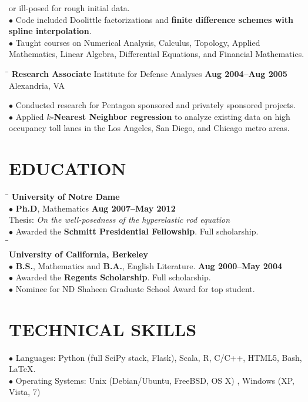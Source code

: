 \documentclass{resume}
\begin{document}
\begin{resume}
or ill-posed for rough initial data. \\
$\bullet$ Code included Doolittle factorizations and \textbf{finite
difference schemes with spline interpolation}. \\
$\bullet$ Taught courses on Numerical Analysis, Calculus,
Topology, Applied Mathematics, Linear Algebra,
Differential Equations, and Financial Mathematics.
\begin{tabbing}
\hspace{2.3in}\= \hspace{2.6in}\= \kill
{\bf Research Associate } \> Institute for
Defense Analyses \>  
\textbf{Aug 2004--Aug 2005}\\
    \>Alexandria, VA
\end{tabbing}
$\bullet$ Conducted research for Pentagon sponsored and privately
sponsored projects. 
\\ 
$\bullet$ Applied \textbf{$k$-Nearest Neighbor regression} to analyze existing data on high
occupancy toll lanes in the Los
Angeles, San Diego, and
Chicago metro areas.
\section{EDUCATION} 
\vspace{-0.05mm}
\begin{tabbing}
\hspace{2.3in}\= \hspace{2.6in}\= \kill
\textbf{University of Notre Dame} \\
$\bullet$ \textbf{Ph.D}, Mathematics \>\>\textbf{Aug 2007--May 2012}
\\ 
Thesis: \textit{On the well-posedness of the hyperelastic rod equation} \\
$\bullet$ Awarded the \textbf{Schmitt Presidential Fellowship}. Full scholarship. \\
\hspace{2.3in}\= \hspace{2.6in}\= \kill
\\
\textbf{University of California, Berkeley}
\\
$\bullet$ \textbf{B.S.}, Mathematics  and  \textbf{B.A.}, English Literature.
\>\>\textbf{Aug 2000--May 2004}
\\
$\bullet$ Awarded the \textbf{Regents Scholarship}. Full scholarship.
\\
$\bullet$ Nominee for ND Shaheen Graduate School Award for top student.
\end{tabbing}
\section{TECHNICAL SKILLS}
\vspace{-0.05mm}
\begin{tabbing}
$\bullet$ Languages: Python (full SciPy stack, Flask), Scala,  R, C/C++,
HTML5, Bash, \LaTeX{}.
\\
$\bullet$ Operating Systems: Unix (Debian/Ubuntu, FreeBSD, OS X) , Windows (XP, Vista, 7) 
\end{tabbing}


\end{resume}
\end{document}
